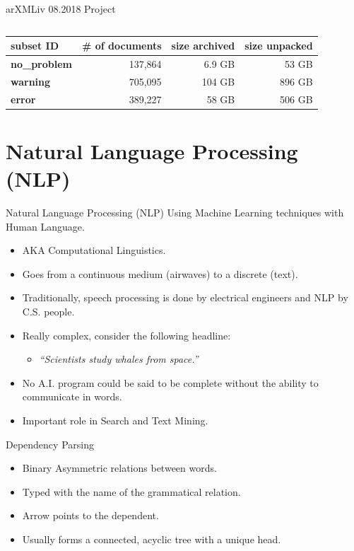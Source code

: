 \documentclass[9pt]{beamer}
\begin{document}
\begin{frame}{arXMLiv 08.2018 Project}
\begin{columns}[T]
\begin{column}{0.3\textwidth}
        \end{column}
    \end{columns}
    \begin{tabular}{|l|r|r|r|}
        \hline
        \textbf{subset ID} &  \textbf{\# of documents} & \textbf{size archived} & \textbf{size unpacked}\\
        \hline
        \textbf{no\_problem} &137,864& 6.9 GB &53 GB\\
        \hline
        \textbf{warning} &705,095 &104 GB &896 GB\\
\hline
 \textbf{error} &389,227 &58 GB &506 GB\\
\hline
    \end{tabular}
\end{frame}
\section{Natural Language Processing (NLP)}
\begin{frame}{Natural Language Processing (NLP)}
    Using Machine Learning techniques with Human Language.
    \begin{itemize}
            \item AKA Computational Linguistics.
            \item Goes from a continuous medium (airwaves) to a discrete (text).
        \item Traditionally, speech processing is done by electrical engineers and NLP by C.S. people.
            \item Really complex, consider the following headline:
                \begin{itemize}
                    \item \textit{``Scientists study whales from space.''}
                \end{itemize}
    \item No A.I. program could be said to be complete without the ability to communicate in words.
        \item Important role in Search and Text Mining.
    \end{itemize}
\end{frame}

\begin{frame}{Dependency Parsing}
    \begin{itemize}
            \item Binary Asymmetric relations between words.
            \item Typed with the name of the grammatical relation.
            \item Arrow points to the dependent.
            \item Usually forms a connected, acyclic tree with a unique head.
    \end{itemize}
\end{frame}
\end{document}
